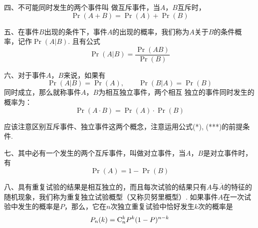 四、不可能同时发生的两个事件叫 做互斥事件，当$A$，$B$互斥时，
\begin{equation}
    \Pr(A+B)=\Pr(A)+\Pr(B)\tag{*}
\end{equation} 

五、在事件$B$出现的条件下，事件$A$的出现的概率，我们称为$A$关于$B$的条件概率，记作$\Pr(A|B)$. 且有公式
\begin{equation}
   \Pr(A|B)=\frac{\Pr(AB)}{\Pr(B)}\tag{**} 
\end{equation}

六、对于事件$A$，$B$来说，如果有
\[\Pr(A|B)=\Pr(A),\qquad \Pr(B|A)=\Pr(B)\]
同时成立，那么就称事件$A$，$B$为相互独立事件，两个相互
独立的事件同时发生的概率为：
\begin{equation}
    \Pr(A\cdot B)=\Pr(A)\cdot \Pr(B) \tag{***}
\end{equation}

应该注意区别互斥事件、独立事件这两个概念，注意运用公式(*), (***)的前提条件.

七、其中必有一个发生的两个互斥事件，叫做对立事件，当$A$，$B$是对立事件时，有
\[\Pr(A)=1-\Pr(B)\]

八、具有重复试验的结果是相互独立的，而且每次试验的结果只有$A$与$\overline{A}$的特征的随机现象，我们称为重复独立试验概型（又称贝努里概型）. 如果事件$A$在一次试验中发生的概率是$P$，那么，它在$n$次独立重复试验中恰好发生$k$次的概率是
\[P_n(k)={\rm C}^{k}_{n}P^k(1-P)^{n-k}\]


